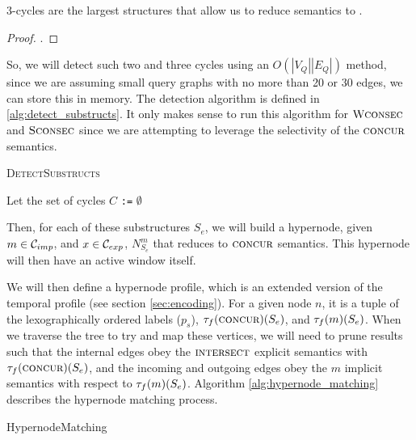 \begin{proposition}
 3-cycles are the largest structures that allow us to reduce \strongConsec{}
 semantics to \concurrent{}.
\end{proposition}

\begin{proof}
  .
\end{proof}

So, we will detect such two and three cycles using an $O(|V_Q||E_Q|)$ method,
since we are assuming small query graphs with no more than 20 or 30 edges, we
can store this in memory. The detection algorithm is defined in
\ref{alg:detect_substructs}. It only makes sense to run this algorithm for
$\textsc{Wconsec}$ and $\textsc{Sconsec}$ since we are attempting to leverage the
selectivity of the $\textsc{concur}$ semantics.

\begin{algorithm}
  \label{alg:detect_substructs}
  \caption{\textsc{DetectSubstructs}}
  \SetAlgoLined

  Let the set of cycles $C$ \texttt{:=} $\emptyset$\;
\end{algorithm}

Then, for each of these substructures $S_e$, we will build a hypernode, given $m
\in \mathcal{C}_{imp}$, and $x \in \mathcal{C}_{exp}$, $N_{S_e}^{m}$ that reduces to $\textsc{concur}$
semantics. This hypernode will then have an active window itself.

We will then define a hypernode profile, which is an extended version of the
temporal profile (see section \ref{sec:encoding}). For a given node $n$, it is a
tuple of the lexographically ordered labels ($p_s$),
$\tau_f(\textsc{concur})(S_e)$, and $\tau_f(m)(S_e)$. When we traverse the
tree to try and map these vertices, we will need to prune results such that the
internal edges obey the $\textsc{intersect}$ explicit semantics with
$\tau_f(\textsc{concur})(S_e)$, and the incoming and outgoing edges obey the $m$
implicit semantics with respect to $\tau_f(m)(S_e)$. Algorithm
\ref{alg:hypernode_matching} describes the hypernode matching process.

\begin{algorithm}
  \label{alg:hypernode_matching}
  \caption{HypernodeMatching}


  \SetAlgoLined
  

\end{algorithm}

